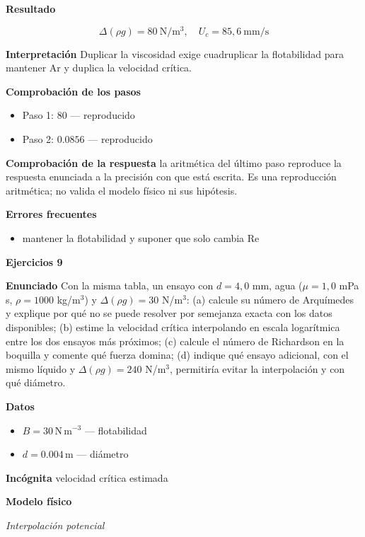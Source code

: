 \documentclass[10pt,openany]{book}
\begin{document}
\noindent\textbf{Resultado}

\[
\Delta(\rho g) = 80\ \mathrm{N/m^{3}},\quad U_c = 85{,}6\ \mathrm{mm/s}
\]

\noindent\textbf{Interpretación}
Duplicar la viscosidad exige cuadruplicar la flotabilidad para mantener Ar y duplica la velocidad crítica.

\noindent\textbf{Comprobación de los pasos}
\begin{itemize}
\item Paso 1: $80$ — reproducido
\item Paso 2: $0.0856$ — reproducido
\end{itemize}

\noindent\textbf{Comprobación de la respuesta} la aritmética del último paso reproduce la respuesta enunciada a la precisión con que está escrita. Es una reproducción aritmética; no valida el modelo físico ni sus hipótesis.

\noindent\textbf{Errores frecuentes}
\begin{itemize}
\item mantener la flotabilidad y suponer que solo cambia Re
\end{itemize}

\noindent\textbf{Ejercicios 9}

\noindent\textbf{Enunciado}
Con la misma tabla, un ensayo con \(d = 4{,}0\) mm, agua (\(\mu = 1{,}0\) mPa s, \(\rho = 1000\) kg/m\(^3\)) y \(\Delta(\rho g) = 30\) N/m\(^3\): (a) calcule su número de Arquímedes y explique por qué no se puede resolver por semejanza exacta con los datos disponibles; (b) estime la velocidad crítica interpolando en escala logarítmica entre los dos ensayos más próximos; (c) calcule el número de Richardson en la boquilla y comente qué fuerza domina; (d) indique qué ensayo adicional, con el mismo líquido y \(\Delta(\rho g) = 240\) N/m\(^3\), permitiría evitar la interpolación y con qué diámetro.

\noindent\textbf{Datos}
\begin{itemize}
\item $B = 30\,\mathrm{N}\,\mathrm{m}^{-3}$ — flotabilidad
\item $d = 0.004\,\mathrm{m}$ — diámetro
\end{itemize}

\noindent\textbf{Incógnita}
velocidad crítica estimada

\noindent\textbf{Modelo físico}

\noindent\textit{Interpolación potencial}
\end{document}
